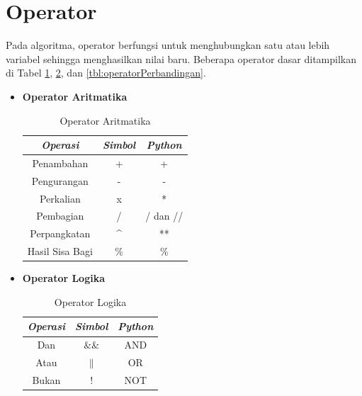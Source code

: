 \section{Operator}
Pada algoritma, operator berfungsi untuk menghubungkan satu atau lebih variabel sehingga menghasilkan nilai baru. Beberapa operator dasar ditampilkan di Tabel \ref{tbl:operatorAritmatika}, \ref{tbl:operatorLogika}, dan \ref{tbl:operatorPerbandingan}.

\FloatBarrier
\begin{itemize}

	\item \textbf{Operator Aritmatika}
			\large
			\begin{table}
				\centering
				\begin{tabular}[h!]{| c | c | c |}
				\hline	
				\textit{Operasi} & \textit{Simbol} & \textit{Python} \\ \hline
				Penambahan & + & + \\ \hline
				Pengurangan & - & - \\ \hline
				Perkalian & x & * \\ \hline
				Pembagian & / & / dan // \\ \hline
				Perpangkatan & \^{}  & ** \\ \hline
				Hasil Sisa Bagi & \% & \% \\
				\hline
				\end{tabular}
				\caption{Operator Aritmatika}
				\label{tbl:operatorAritmatika}
		\end{table}
	\FloatBarrier
	\item \textbf{Operator Logika}
			\large
			\begin{table}
				\centering
				\begin{tabular}[h!]{| c | c | c |}
				\hline	
				\textit{Operasi} & \textit{Simbol} & \textit{Python} \\ \hline
				Dan & $\&\&$ & AND \\ \hline
				Atau & $\|$ & OR \\ \hline
				Bukan & $!$ & NOT \\ 
				\hline
				\end{tabular}
				\caption{Operator Logika}
				\label{tbl:operatorLogika}
		\end{table}


\end{itemize}
